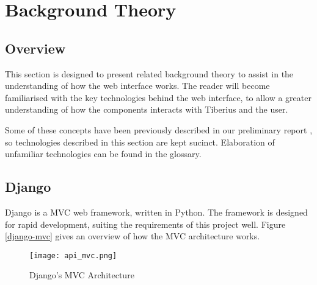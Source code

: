 \section{Background Theory}

\subsection{Overview}
This section is designed to present related background theory to assist in the
understanding of how the web interface works. The reader will become
familiarised with the key technologies behind the web interface, to allow a
greater understanding of how the components interacts with Tiberius and the
user.

Some of these concepts have been previously described in our preliminary report \cite{tibby-lit-review}, so technologies described in this section are kept sucinct. Elaboration of unfamiliar technologies can be found in the glossary.






\subsection{Django}
Django is a \gls{MVC} web framework, written in Python. The framework is designed for rapid development, suiting the requirements of this project well. Figure \ref{django-mvc} gives an overview of how the MVC architecture works.

\begin{figure}[!htb]
\begin{center}
\texttt{[image: api\_mvc.png]}
\end{center}
\caption{Django's MVC Architecture}
\label{fig:django-mvc}
\end{figure}

